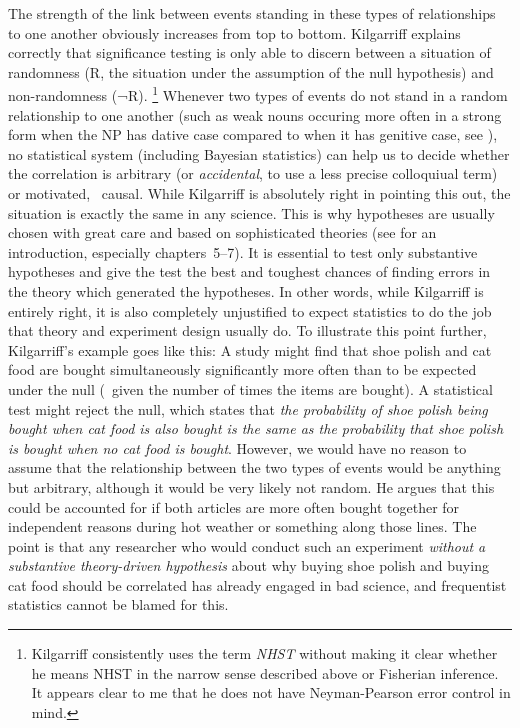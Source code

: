 The strength of the link between events standing in these types of relationships to one another obviously increases from top to bottom.
Kilgarriff explains correctly that significance testing is only able to discern between a situation of randomness (R, the situation under the assumption of the null hypothesis) and non-randomness (¬R).%
\footnote{Kilgarriff consistently uses the term \textit{NHST} without making it clear whether he means NHST in the narrow sense described above or Fisherian inference.
It appears clear to me that he does not have Neyman-Pearson error control in mind.}
Whenever two types of events do not stand in a random relationship to one another (such as weak nouns occuring more often in a strong form when the NP has dative case compared to when it has genitive case, see \RAWeakN), no statistical system (including Bayesian statistics) can help us to decide whether the correlation is arbitrary (or \textit{accidental}, to use a less precise colloquiual term) or motivated, \ie\ causal.
While Kilgarriff is absolutely right in pointing this out, the situation is exactly the same in any science.
This is why hypotheses are usually chosen with great care and based on sophisticated theories (see \citealt{Chalmers2013} for an introduction, especially chapters~5--7).
It is essential to test only substantive hypotheses and give the test the best and toughest chances of finding errors in the theory which generated the hypotheses.
In other words, while Kilgarriff is entirely right, it is also completely unjustified to expect statistics to do the job that theory and experiment design usually do.
To illustrate this point further, Kilgarriff's example goes like this:
A study might find that shoe polish and cat food are bought simultaneously significantly more often than to be expected under the null (\ie\ given the number of times the items are bought).
A statistical test might reject the null, which states that \textit{the probability of shoe polish being bought when cat food is also bought is the same as the probability that shoe polish is bought when no cat food is bought}.
However, we would have no reason to assume that the relationship between the two types of events would be anything but arbitrary, although it would be very likely not random.
He argues that this could be accounted for if both articles are more often bought together for independent reasons during hot weather or something along those lines.
The point is that any researcher who would conduct such an experiment \textit{without a substantive theory-driven hypothesis} about why buying shoe polish and buying cat food should be correlated has already engaged in bad science, and frequentist statistics cannot be blamed for this.

